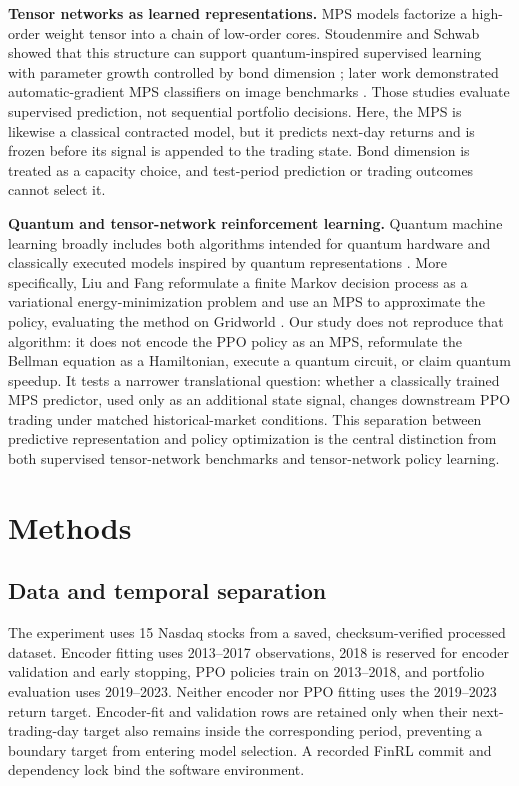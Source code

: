 \documentclass[conference]{IEEEtran}
\begin{document}
\textbf{Tensor networks as learned representations.}
MPS models factorize a high-order weight tensor into a chain of low-order
cores. Stoudenmire and Schwab showed that this structure can support
quantum-inspired supervised learning with parameter growth controlled by bond
dimension \cite{stoudenmire2016supervised}; later work demonstrated
automatic-gradient MPS classifiers on image benchmarks
\cite{efthymiou2019tensornetwork}. Those studies evaluate supervised
prediction, not sequential portfolio decisions. Here, the MPS is likewise a
classical contracted model, but it predicts next-day returns and is frozen
before its signal is appended to the trading state. Bond dimension is treated
as a capacity choice, and test-period prediction or trading outcomes cannot
select it.

\textbf{Quantum and tensor-network reinforcement learning.}
Quantum machine learning broadly includes both algorithms intended for quantum
hardware and classically executed models inspired by quantum representations
\cite{biamonte2017quantum}. More specifically, Liu and Fang reformulate a
finite Markov decision process as a variational energy-minimization problem and
use an MPS to approximate the policy, evaluating the method on Gridworld
\cite{liu2020quantumtensor}. Our study does not reproduce that algorithm: it
does not encode the PPO policy as an MPS, reformulate the Bellman equation as a
Hamiltonian, execute a quantum circuit, or claim quantum speedup. It tests a
narrower translational question: whether a classically trained MPS predictor,
used only as an additional state signal, changes downstream PPO trading under
matched historical-market conditions. This separation between predictive
representation and policy optimization is the central distinction from both
supervised tensor-network benchmarks and tensor-network policy learning.

\section{Methods}

\subsection{Data and temporal separation}

The experiment uses 15 Nasdaq stocks from a saved, checksum-verified processed
dataset. Encoder fitting uses 2013--2017 observations, 2018 is reserved for
encoder validation and early stopping, PPO policies train on 2013--2018, and
portfolio evaluation uses 2019--2023. Neither encoder nor PPO fitting uses the
2019--2023 return target. Encoder-fit and validation rows are retained only
when their next-trading-day target also remains inside the corresponding
period, preventing a boundary target from entering model selection. A recorded
FinRL commit and dependency lock bind the software environment.
\end{document}
